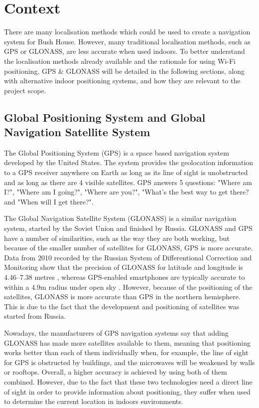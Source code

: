 \section{Context}
\label{sec:context}
There are many localisation methods which could be used to create a navigation system for Bush House. However, many traditional localisation methods, such as GPS or GLONASS, are less accurate when used indoors. To better understand the localisation methods already available and the rationale for using Wi-Fi positioning, GPS \& GLONASS will be detailed in the following sections, along with alternative indoor positioning systems, and how they are relevant to the project scope.

\subsection{Global Positioning System and Global Navigation Satellite System}
\label{sec:gps-glonass}

The Global Positioning System (GPS) \cite{gps} is a space based navigation system developed by the United States. The system provides the geolocation information to a GPS receiver anywhere on Earth as long as its line of sight is unobstructed and as long as there are 4 visible satellites. GPS answers 5 questions: "Where am I?", "Where am I going?", "Where are you?", "What's the best way to get there? and "When will I get there?"\cite{gps}.

The Global Navigation Satellite System (GLONASS) is a similar navigation system, started by the Soviet Union and finished by Russia. GLONASS and GPS have a number of similarities, such as the way they are both working, but because of the smaller number of satellites for GLONASS, GPS is more accurate. Data from 2010 recorded by the Russian System of Differentional Correction and Monitoring show that the precision of GLONASS for latitude and longitude is 4.46–7.38 metres \cite{russian-monitoring-system}, whereas GPS-enabled smartphones are typically accurate to within a 4.9m  radius under open sky \cite{gps-gov}. However, because of the positioning of the satellites, GLONASS is more accurate than GPS in the northern hemisphere. This is due to the fact that the development and positioning of satellites was started from Russia.

Nowadays, the manufacturers of GPS navigation systems say that adding GLONASS has made more satellites available to them, meaning that positioning works better than each of them individually when, for example, the line of sight for GPS is obstructed by buildings, and the microwaves will be weakened by walls or rooftops. Overall, a higher accuracy is achieved \cite{glonass-gps-1, glonass-gps-2} by using both of them combined. However, due to the fact that these two technologies need a direct line of sight in order to provide information about positioning, they suffer when used to determine the current location in indoors environments.

